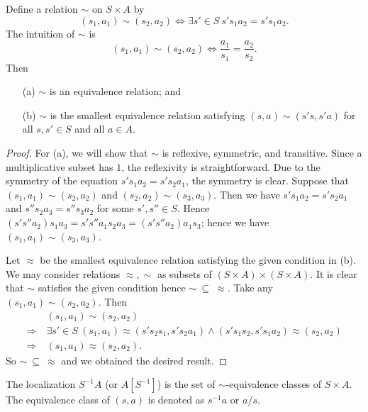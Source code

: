 \begin{proposition}
\label{note14_1}
    Define a relation $\sim$ on $S \times A$ by $$(s_1, a_1) \sim (s_2, a_2) \Leftrightarrow \exists s' \in S \ s's_1a_2 = s's_1a_2.$$
    \noindent
    The intuition of $\sim$ is $$(s_1, a_1) \sim (s_2, a_2) \Leftrightarrow \frac{a_1}{s_1} = \frac{a_2}{s_2}.$$
    \noindent Then
    \begin{itemize}
        \item[(a)] $\sim$ is an equivalence relation; and
        \item[(b)] $\sim$ is the smallest equivalence relation satisfying $(s, a) \sim (s's, s'a)$ for all $s, s' \in S$ and all $a \in A$.
    \end{itemize}
\end{proposition}
\begin{proof}
    For (a), we will show that $\sim$ is reflexive, symmetric, and transitive. Since a multiplicative subset has $1$, the reflexivity is straightforward. Due to the symmetry of the equation $s's_1a_2 = s's_2a_1$, the symmetry is clear. Suppose that $(s_1,a_1) \sim (s_2, a_2)$ and $(s_2, a_2) \sim (s_3, a_3)$. Then we have $s's_1a_2 = s's_2a_1$ and $s''s_2a_3 = s''s_3a_2$ for some $s', s'' \in S$. Hence $(s's''a_2)s_1a_3 = s's''a_1s_2a_3 = (s's''a_2)a_1s_3$; hence we have $(s_1, a_1) \sim (s_3, a_3)$.

    Let $\approx$ be the smallest equivalence relation satisfying the given condition in (b). We may consider relations $\approx, \sim$ as subsets of $(S \times A)\times (S \times A)$. It is clear that $\sim$ satisfies the given condition hence $\sim \ \subseteq\ \approx$. Take any $(s_1, a_1) \sim (s_2, a_2)$. Then
    \begin{align*}
        &(s_1, a_1) \sim (s_2, a_2)\\
        \Rightarrow \ &\exists s'\in S \ (s_1,a_1) \approx (s' s_2s_1, s's_2a_1) \wedge (s' s_1s_2, s's_1a_2) \approx (s_2, a_2)\\
        \Rightarrow \ & (s_1, a_1) \approx (s_2, a_2).
    \end{align*}
    So $\sim \ \subseteq\ \approx$ and we obtained the desired result.
\end{proof}

\begin{definition}
    The localization $S^{-1}A$ (or $A[S^{-1}]$) is the set of $\sim$-equivalence classes of $S \times A$. The equivalence class of $(s, a)$ is denoted as $s^{-1}a$ or $a/s$.
\end{definition}

